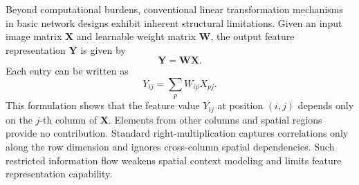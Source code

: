 \documentclass[pdflatex,sn-mathphys-num]{sn-jnl}%
\theoremstyle{thmstyleone}%
\theoremstyle{thmstyletwo}%
\theoremstyle{thmstylethree}%
\begin{document}
Beyond computational burdens, conventional linear transformation mechanisms in basic network designs exhibit inherent structural limitations. Given an input image matrix $\boldsymbol{X}$ and learnable weight matrix $\boldsymbol{W}$, the output feature representation $\boldsymbol{Y}$ is given by
\[
\boldsymbol{Y} = \boldsymbol{W}\boldsymbol{X}.
\]
Each entry can be written as
\[
Y_{ij} = \sum_{p} W_{ip} X_{pj}.
\]
This formulation shows that the feature value $Y_{ij}$ at position $(i,j)$ depends only on the $j$-th column of $\boldsymbol{X}$. Elements from other columns and spatial regions provide no contribution. Standard right-multiplication captures correlations only along the row dimension and ignores cross-column spatial dependencies. Such restricted information flow weakens spatial context modeling and limits feature representation capability.
\end{document}

